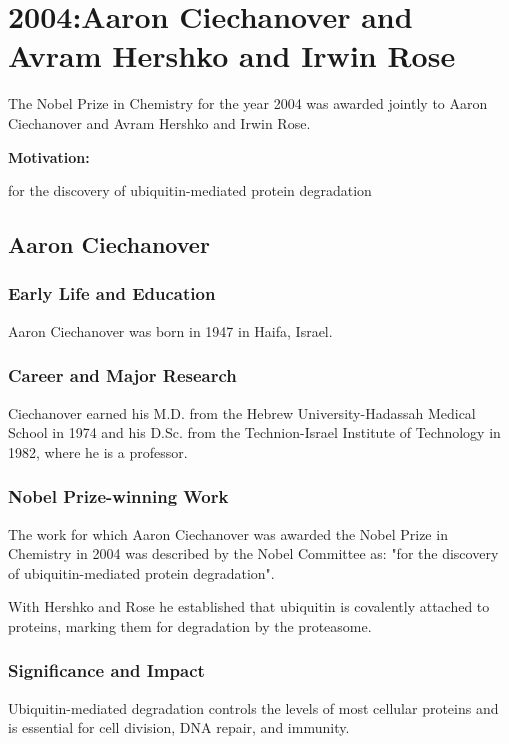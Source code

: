 \chapter{2004:Aaron Ciechanover and Avram Hershko and Irwin Rose}

\label{chap:chemistry2004}

The Nobel Prize in Chemistry for the year 2004 was awarded jointly to Aaron Ciechanover and Avram Hershko and Irwin Rose.

\textbf{Motivation:}

for the discovery of ubiquitin-mediated protein degradation

\section{Aaron Ciechanover}

\subsection*{Early Life and Education}

Aaron Ciechanover was born in 1947 in Haifa, Israel.

\subsection*{Career and Major Research}

Ciechanover earned his M.D. from the Hebrew University-Hadassah Medical School in 1974 and his D.Sc. from the Technion-Israel Institute of Technology in 1982, where he is a professor.

\subsection*{Nobel Prize-winning Work}

The work for which Aaron Ciechanover was awarded the Nobel Prize in Chemistry in 2004 was described by the Nobel Committee as: "for the discovery of ubiquitin-mediated protein degradation".

With Hershko and Rose he established that ubiquitin is covalently attached to proteins, marking them for degradation by the proteasome.

\subsection*{Significance and Impact}

Ubiquitin-mediated degradation controls the levels of most cellular proteins and is essential for cell division, DNA repair, and immunity.

